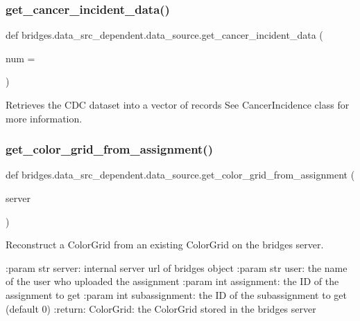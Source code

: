 \subsubsection{\texorpdfstring{get\+\_\+cancer\+\_\+incident\+\_\+data()}{get\_cancer\_incident\_data()}}
{\footnotesize\ttfamily def bridges.\+data\+\_\+src\+\_\+dependent.\+data\+\_\+source.\+get\+\_\+cancer\+\_\+incident\+\_\+data (\begin{DoxyParamCaption}\item[{}]{num = {} }\end{DoxyParamCaption})}



Retrieves the C\+DC dataset into a vector of records See Cancer\+Incidence class for more information. 

\mbox{\label{namespacebridges_1_1data__src__dependent_1_1data__source_a87295c22accd698a4573e9f4287c4096}} 
\subsubsection{\texorpdfstring{get\+\_\+color\+\_\+grid\+\_\+from\+\_\+assignment()}{get\_color\_grid\_from\_assignment()}}
{\footnotesize\ttfamily def bridges.\+data\+\_\+src\+\_\+dependent.\+data\+\_\+source.\+get\+\_\+color\+\_\+grid\+\_\+from\+\_\+assignment (\begin{DoxyParamCaption}\item[{}]{server }\end{DoxyParamCaption})}



Reconstruct a Color\+Grid from an existing Color\+Grid on the bridges server. 

\+:param str server\+: internal server url of bridges object \+:param str user\+: the name of the user who uploaded the assignment \+:param int assignment\+: the ID of the assignment to get \+:param int subassignment\+: the ID of the subassignment to get (default 0) \+:return\+: Color\+Grid\+: the Color\+Grid stored in the bridges server \mbox{\label{namespacebridges_1_1data__src__dependent_1_1data__source_a0d2a8b28fa0fa79440112d02ca9cd7fc}} 

